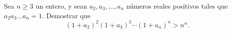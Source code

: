 Sea $n \geq 3$ un entero, y sean $a_2, a_3, \dots, a_n$ números reales positivos tales que
$a_2a_3 \dots a_n = 1$. Demostrar que
\[(1 + a_2)^2 (1 + a_3)^3 \dotsm (1 + a_n)^n > n^n.\]